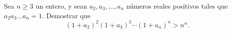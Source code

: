 Sea $n \geq 3$ un entero, y sean $a_2, a_3, \dots, a_n$ números reales positivos tales que
$a_2a_3 \dots a_n = 1$. Demostrar que
\[(1 + a_2)^2 (1 + a_3)^3 \dotsm (1 + a_n)^n > n^n.\]